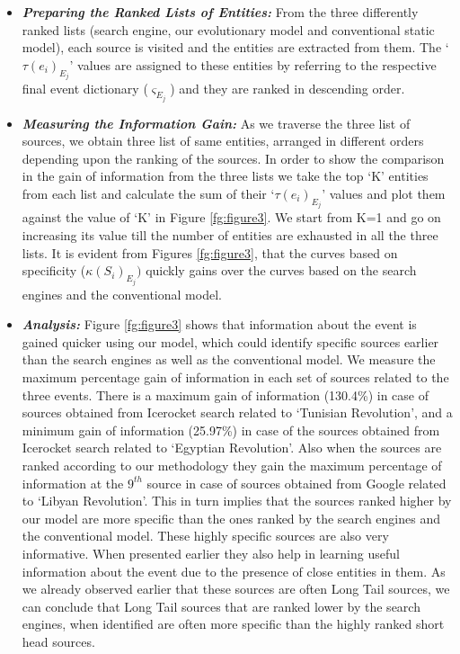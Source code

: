 \begin{itemize}

\item \noindent \textit{\textbf{Preparing the Ranked Lists of Entities:}} From the three differently ranked lists (search engine, our evolutionary model and conventional static model), each source is visited and the entities are extracted from them. The `$\tau(e_{i})_{E_{j}}$' values are assigned to these entities by referring to the respective final event dictionary ($\varsigma_{E_{j}}$) and they are ranked in descending order. 

\item \noindent \textit{\textbf{Measuring the Information Gain:}} As we traverse the three list of sources, we obtain three list of same entities, arranged in different orders depending upon the ranking of the sources. In order to show the comparison  in the gain of information from the three lists we take the top `K' entities from each list and calculate the sum of their `$\tau(e_{i})_{E_{j}}$' values and plot them against the value of `K' in Figure \ref{fg:figure3}. We start from K=1 and go on increasing its value till the number of entities are exhausted in all the three lists. It is evident from Figures \ref{fg:figure3}, that the curves based on specificity ($\kappa(S_{i})_{E_{j}})$ quickly gains over the curves based on the search engines and the conventional model. 

\item \noindent \textit{\textbf{Analysis:}} Figure \ref{fg:figure3} shows that information about the event is gained quicker using our model, which could identify specific sources earlier than the search engines as well as the conventional model. We measure the maximum percentage gain of information in each set of sources related to the three events. There is a maximum gain of information (130.4\%) in case of sources obtained from Icerocket search related to `Tunisian Revolution', and a minimum gain of information (25.97\%) in case of the sources obtained from Icerocket search related to `Egyptian Revolution'. Also when the sources are ranked according to our methodology they gain the maximum percentage of information at the $9^{th}$ source in case of sources obtained from Google related to `Libyan Revolution'. This in turn implies that the sources ranked higher by our model are more specific than the ones ranked by the search engines and the conventional model. These highly specific sources are also very informative. When presented earlier they also help in learning useful information about the event due to the presence of close entities in them. As we already observed earlier that these sources are often Long Tail sources, we can conclude that Long Tail sources that are ranked lower by the search engines, when identified are often more specific than the highly ranked short head sources. 

\end{itemize}




